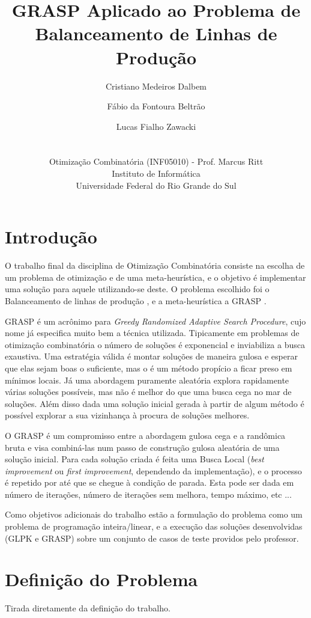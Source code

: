 \documentclass{report}
\title{GRASP Aplicado ao Problema de Balanceamento de Linhas de Produção}
\author{Cristiano Medeiros Dalbem \and Fábio da Fontoura Beltrão \and Lucas Fialho Zawacki\\
\\
\\
\small Otimização Combinatória (INF05010) - Prof. Marcus Ritt\\
\small Instituto de Informática\\[-0.8ex]
\small Universidade Federal do Rio Grande do Sul
}
\begin{document}
\maketitle
\tableofcontents

\chapter{Introdução}

O trabalho final da disciplina de Otimização Combinatória consiste na escolha de
 um problema de otimização e de uma meta-heurística, e o objetivo é implementar
 uma solução para aquele utilizando-se deste. O problema escolhido foi o
 Balanceamento de linhas de produção \cite{salbp}, e a meta-heurística a GRASP \cite{grasp}.

GRASP é um acrônimo para \emph{Greedy Randomized Adaptive Search Procedure},
cujo nome já especifica muito bem a técnica utilizada. Tipicamente em problemas
de otimização combinatória o número de soluções é exponencial e inviabiliza a
busca exaustiva. Uma estratégia válida é montar soluções de maneira gulosa e
esperar que elas sejam boas o suficiente, mas o é um método propício a ficar
preso em mínimos locais. Já uma abordagem puramente aleatória explora rapidamente
várias soluções possíveis, mas não é melhor do que uma busca cega no mar de soluções.
Além disso dada uma solução inicial gerada à partir de algum método é possível
explorar a sua vizinhança à procura de soluções melhores.

O GRASP é um compromisso entre a abordagem gulosa cega e a randômica bruta e
visa combiná-las num passo de construção gulosa aleatória de uma solução
inicial. Para cada solução criada é feita uma Busca Local (\emph{best improvement} ou
\emph{first improvement}, dependendo da implementação),
e o processo é repetido por até que se chegue à condição de parada. Esta pode ser
dada em número de iterações, número de iterações sem melhora, tempo máximo, etc ...

Como objetivos adicionais do trabalho estão a formulação do problema como
um problema de programação inteira/linear, e a execução das soluções
desenvolvidas (GLPK e GRASP) sobre um conjunto de casos de
teste providos pelo professor.

\chapter{Definição do Problema}

Tirada diretamente da definição do trabalho.
\end{document}
